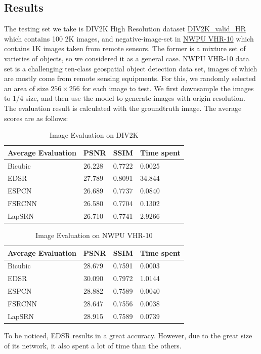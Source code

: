 \documentclass[10pt,twocolumn,letterpaper]{article}
\begin{document}
\subsection{Results}
The testing set we take is DIV2K High Resolution dataset \href{https://data.vision.ee.ethz.ch/cvl/DIV2K}{DIV2K\_valid\_HR} 
which contains 100 2K images, and negative-image-set in \href{https://hyper.ai/datasets/5422}{NWPU VHR-10} which contains 1K images taken from remote sensors.
The former is a mixture set of varieties of objects, so we considered it as a general case.
NWPU VHR-10 data set is a challenging ten-class geospatial object detection data set, images of which are mostly come from remote sensing equipments. 
For this, we randomly selected an area of size $256\times 256$ for each image to test.
We first downsample the images to 1/4 size, and then use the model to generate images with origin resolution.
The evaluation result is calculated with the groundtruth image.
The average scores are as follows:
\begin{table}[H]
    \centering
    \caption{Image Evaluation on DIV2K}
    \begin{tabular}{|l|l|l|l|}
    \hline
    Average Evaluation  & PSNR   & SSIM   & Time spent  \\ \hline
    Bicubic             & 26.228 & 0.7722 & 0.0025      \\ \hline
    EDSR                & 27.789 & 0.8091 & 34.844      \\ \hline
    ESPCN               & 26.689 & 0.7737 & 0.0840      \\ \hline
    FSRCNN              & 26.580 & 0.7704 & 0.1302      \\ \hline
    LapSRN              & 26.710 & 0.7741 & 2.9266      \\ \hline
    \end{tabular}
\end{table}
\begin{table}[H]
    \centering
    \caption{Image Evaluation on NWPU VHR-10}
    \begin{tabular}{|l|l|l|l|}
    \hline
    Average Evaluation  & PSNR   & SSIM   & Time spent  \\ \hline
    Bicubic             & 28.679 & 0.7591 & 0.0003      \\ \hline
    EDSR                & 30.090 & 0.7972 & 1.0144      \\ \hline
    ESPCN               & 28.882 & 0.7589 & 0.0040      \\ \hline
    FSRCNN              & 28.647 & 0.7556 & 0.0038      \\ \hline
    LapSRN              & 28.915 & 0.7589 & 0.0739      \\ \hline
    \end{tabular}
\end{table}
To be noticed, EDSR results in a great accuracy. 
However, due to the great size of its network, it also spent a lot of time than the others.
\end{document}

